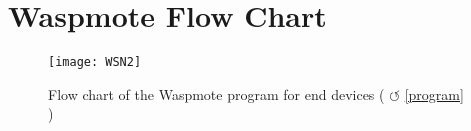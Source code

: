 \clearpage
\section{Waspmote Flow Chart}
\label{AppendixE} %
\begin{figure}[htbp]
\centering
\texttt{[image: WSN2]}
\caption{Flow chart of the Waspmote program for end devices ( $\circlearrowleft$ \ref{program} )}
\label{fig:flow22}
\end{figure}

